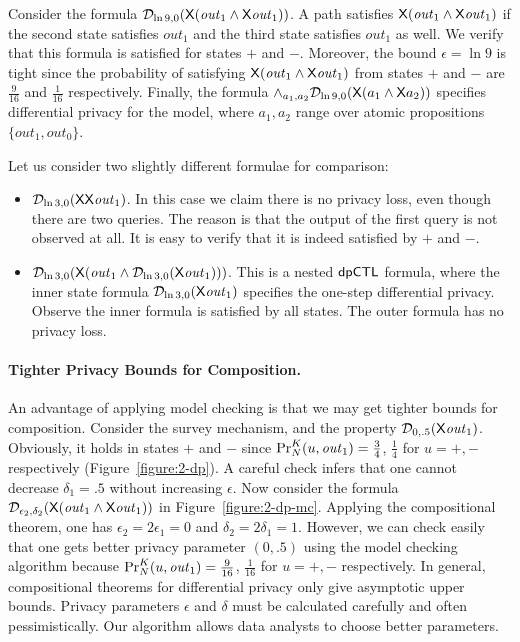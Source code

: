 Consider the formula $\dpriv{\ln 9}{0} (\X (\mathit{out}_1\wedge \X \mathit{out}_1))$. A path satisfies $\X (\mathit{out}_1\wedge \X \mathit{out}_1)$ if the second state satisfies $\mathit{out}_1$ and the third state satisfies $\mathit{out}_1$ as well. We verify that this formula is satisfied for states $+$ and $-$. Moreover, the bound $\epsilon=\ln 9$ is tight since the probability of satisfying $\X (\mathit{out}_1\wedge \X \mathit{out}_1)$ from states $+$ and $-$ are $\frac{9}{16}$ and $\frac{1}{16}$ respectively. Finally, the formula $\wedge_{a_1,a_2}\dpriv{\ln 9}{0} (\X (a_1\wedge \X a_2))$ specifies differential privacy for the model, where $a_1,a_2$ range over atomic propositions $\{\mathit{out}_1, \mathit{out}_0\}$.

Let us consider two slightly different formulae for comparison:
\begin{itemize}
\item $\dpriv{\ln 3}{0} (\X \X \mathit{out}_1)$. In this case we claim
  there is no privacy loss, even though there are two queries. The reason is that the output of the first query is not observed at all. It is easy to verify that it is indeed satisfied by $+$ and $-$.
\item $\dpriv{\ln 3}{0} (\X (\mathit{out}_1\wedge \dpriv{\ln 3}{0}(\X \mathit{out}_1)))$. This is a nested $\dpCTL$ formula, where the inner state formula $\dpriv{\ln 3}{0}(\X \mathit{out}_1)$ specifies the one-step differential privacy. Observe the inner formula is satisfied by all states. The outer formula has no privacy loss.
\end{itemize}

\paragraph{Tighter Privacy Bounds for Composition.}
An advantage of applying model checking is that we may get tighter
bounds for composition. Consider the survey mechanism, and the
property $\dpriv{0}{.5} (\X \mathit{out}_1)$. Obviously, it holds in
states $+$ and $-$ since $\myPr{u}{K}{N}{\mathit{out}_1} =
\frac{3}{4}$, $\frac{1}{4}$ for $u = +, -$ respectively (Figure~\ref{figure:2-dp}). A careful check infers that one cannot decrease  $\delta_1=.5$ without increasing $\epsilon$.
Now consider the formula $\dpriv{\epsilon_2}{\delta_2} (\X
(\mathit{out}_1\wedge \X \mathit{out}_1))$ in
Figure~\ref{figure:2-dp-mc}. Applying the
compositional theorem, one has $\epsilon_2=2\epsilon_1=0$ and
$\delta_2=2\delta_1=1$. However, we can check easily that one gets
better privacy parameter $(0,.5)$ using the model checking algorithm
because $\myPr{u}{K}{N}{\mathit{out}_1} = \frac{9}{16}$,
$\frac{1}{16}$ for $u = +, -$ respectively.
In general, compositional theorems for differential privacy only give
asymptotic upper bounds. Privacy parameters $\epsilon$ and $\delta$
must be calculated carefully and often pessimistically. Our
algorithm allows data analysts to choose better parameters.

